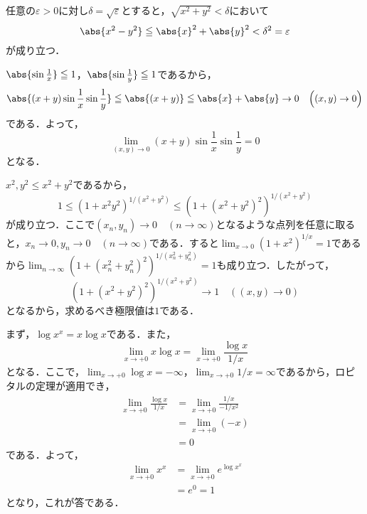 

\begin{tanswer}
    任意の$\varepsilon > 0$に対し$\delta = \sqrt{\varepsilon}$とすると，$\sqrt{x^2 + y^2} < \delta$において
    \[
        \abs{x^2-y^2} \leq \abs{x}^2 + \abs{y}^2 < \delta^2 = \varepsilon
    \]
    が成り立つ．
\end{tanswer}






\begin{tanswer}
    $\abs{\sin \frac{1}{x}} \le 1$，$\abs{\sin \frac{1}{y}} \le 1$であるから，
    \[
        \abs{(x+y) \sin \frac{1}{x} \sin \frac{1}{y}} \le \abs{(x+y)} \le \abs{x}+\abs{y} \to 0 \quad  \Bigl( (x,y) \to 0 \Bigl)
    \]
    である．よって，
    \[
        \lim_{(x,y)\to 0} (x+y) \sin \frac{1}{x} \sin \frac{1}{y} =0
    \]
    となる．
\end{tanswer}


\begin{tanswer}
    $x^2,y^2 \leq x^2+y^2$であるから，
    \[
        1 \leq (1 + x^2 y^2)^{1/(x^2+y^2)} \leq (1 + (x^2+y^2)^2)^{1/(x^2+y^2)}
    \]
    が成り立つ．ここで$(x_n, y_n) \to 0 \quad (n \to \infty)$となるような点列を任意に取ると，$x_n \to 0, y_n \to 0 \quad (n \to \infty)$である．すると$\lim_{x \to 0} (1+x^2)^{1/x} = 1$であるから$\lim_{n \to \infty} (1 + (x_n^2+y_n^2)^2)^{1/(x_n^2+y_n^2)} = 1$も成り立つ．したがって，
    \[
        (1 + (x^2+y^2)^2)^{1/(x^2+y^2)} \to 1 \quad ((x,y) \to 0)
    \]
    となるから，求めるべき極限値は$1$である．
\end{tanswer}



\begin{tanswer}
    まず，$\log x^x = x \log x$である．また，
    \[
        \lim_{x \to +0} x \log x  =\lim_{x \to +0} \frac{\log x}{1/x}
    \]
    となる．ここで，$\lim_{x \to +0} \log x = -\infty$，$\lim_{x \to +0} 1/x =\infty$であるから，ロピタルの定理が適用でき，
    \begin{align*}
        \lim_{x \to +0} \frac{\log x}{1/x} & = \lim_{x \to +0} \frac{1/x}{-1/x^2} \\
                                           & = \lim_{x \to +0} (-x)               \\
                                           & =0
    \end{align*}
    である．よって，
    \begin{align*}
        \lim_{x \to +0} x^x & = \lim_{x \to +0} e^{\log x^x} \\
                            & =e^0 =1
    \end{align*}
    となり，これが答である．
\end{tanswer}

